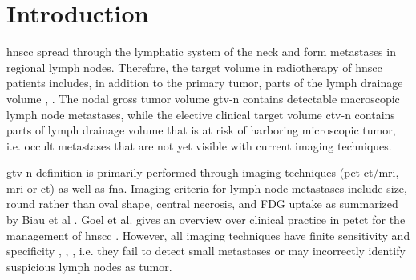 \documentclass[\relativeRoot/main.tex]{subfiles}
\begin{document}
\section{Introduction}
\label{sec:dataset_usz:introduction}

\Gls{hnscc} spread through the lymphatic system of the neck and form metastases in regional lymph nodes. Therefore, the target volume in radiotherapy of \gls{hnscc} patients includes, in addition to the primary tumor, parts of the lymph drainage volume \cite{biau_selection_2019}, \cite{grosu_target_2015}. The nodal gross tumor volume \gls{gtv-n} contains detectable macroscopic lymph node metastases, while the elective clinical target volume \gls{ctv-n} contains parts of lymph drainage volume that is at risk of harboring microscopic tumor, i.e. occult metastases that are not yet visible with current imaging techniques.

\Gls{gtv-n} definition is primarily performed through imaging techniques (\acrshort{pet}-\acrshort{ct}/\gls{mri}, \gls{mri} or \gls{ct}) as well as \gls{fna}. Imaging criteria for lymph node metastases include size, round rather than oval shape, central necrosis, and FDG uptake as summarized by Biau et al \cite{biau_selection_2019}. Goel et al. gives an overview over clinical practice in \acrshort{pet}\acrshort{ct} for the management of \gls{hnscc} \cite{goel_clinical_2017}. However, all imaging techniques have finite sensitivity and specificity \cite{park_diagnostic_2020}, \cite{jensen_imaging_2021}, \cite{rohde_18f-fluoro-deoxy-glucose-positron_2014}, i.e. they fail to detect small metastases or may incorrectly identify suspicious lymph nodes as tumor.
\end{document}
